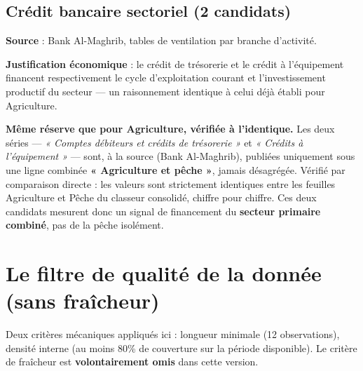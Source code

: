 \documentclass[11pt,a4paper]{article}
\begin{document}
\subsection{Crédit bancaire sectoriel (2 candidats)}

\textbf{Source} : Bank Al-Maghrib, tables de ventilation par branche d'activité.

\textbf{Justification économique} : le crédit de trésorerie et le crédit à l'équipement financent respectivement le cycle d'exploitation courant et l'investissement productif du secteur --- un raisonnement identique à celui déjà établi pour Agriculture.

\begin{alertebox}
\textbf{Même réserve que pour Agriculture, vérifiée à l'identique.} Les deux séries --- \textit{« Comptes débiteurs et crédits de trésorerie »} et \textit{« Crédits à l'équipement »} --- sont, à la source (Bank Al-Maghrib), publiées uniquement sous une ligne combinée \textbf{« Agriculture et pêche »}, jamais désagrégée. Vérifié par comparaison directe : les valeurs sont strictement identiques entre les feuilles Agriculture et Pêche du classeur consolidé, chiffre pour chiffre. Ces deux candidats mesurent donc un signal de financement du \textbf{secteur primaire combiné}, pas de la pêche isolément.
\end{alertebox}

\section{Le filtre de qualité de la donnée (sans fraîcheur)}
\label{sec:qualite}

Deux critères mécaniques appliqués ici : longueur minimale (12 observations), densité interne (au moins 80\% de couverture sur la période disponible). Le critère de fraîcheur est \textbf{volontairement omis} dans cette version.
\end{document}
